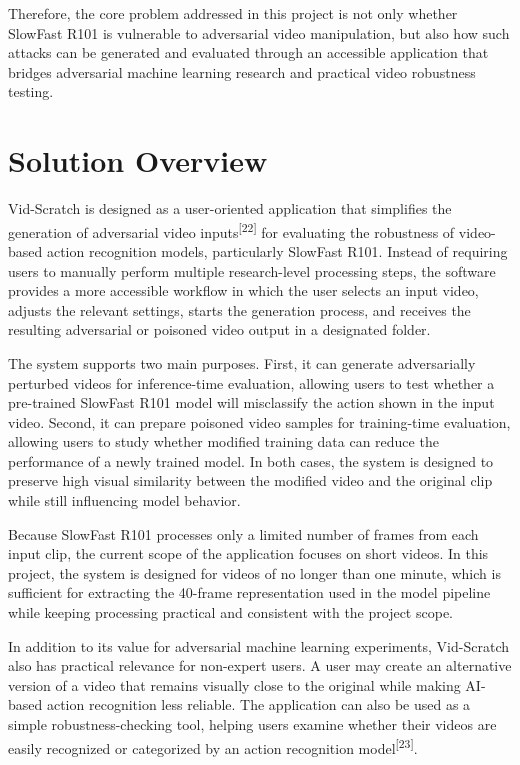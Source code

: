 Therefore, the core problem addressed in this project is not only whether SlowFast R101 is vulnerable to adversarial video manipulation, but also how such attacks can be generated and evaluated through an accessible application that bridges adversarial machine learning research and practical video robustness testing.

\section{Solution Overview}
\label{section:solution-overview}

Vid-Scratch is designed as a user-oriented application that simplifies the generation of adversarial video inputs\textsuperscript{[22]} for evaluating the robustness of video-based action recognition models, particularly SlowFast R101. Instead of requiring users to manually perform multiple research-level processing steps, the software provides a more accessible workflow in which the user selects an input video, adjusts the relevant settings, starts the generation process, and receives the resulting adversarial or poisoned video output in a designated folder.

The system supports two main purposes. First, it can generate adversarially perturbed videos for inference-time evaluation, allowing users to test whether a pre-trained SlowFast R101 model will misclassify the action shown in the input video. Second, it can prepare poisoned video samples for training-time evaluation, allowing users to study whether modified training data can reduce the performance of a newly trained model. In both cases, the system is designed to preserve high visual similarity between the modified video and the original clip while still influencing model behavior.

Because SlowFast R101 processes only a limited number of frames from each input clip, the current scope of the application focuses on short videos. In this project, the system is designed for videos of no longer than one minute, which is sufficient for extracting the 40-frame representation used in the model pipeline while keeping processing practical and consistent with the project scope.

In addition to its value for adversarial machine learning experiments, Vid-Scratch also has practical relevance for non-expert users. A user may create an alternative version of a video that remains visually close to the original while making AI-based action recognition less reliable. The application can also be used as a simple robustness-checking tool, helping users examine whether their videos are easily recognized or categorized by an action recognition model\textsuperscript{[23]}.

